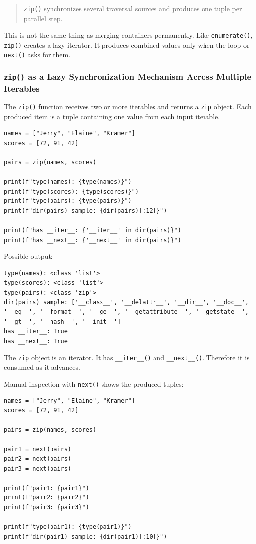 \documentclass[a4paper,twoside]{report}
\begin{document}
\begin{quote}
\texttt{zip()} synchronizes several traversal sources and produces one tuple per parallel step.
\end{quote}

This is not the same thing as merging containers permanently. Like \texttt{enumerate()}, \texttt{zip()} creates a lazy iterator. It produces combined values only when the loop or \texttt{next()} asks for them.

\subsubsection{\texttt{zip()} as a Lazy Synchronization Mechanism Across Multiple Iterables}

The \texttt{zip()} function receives two or more iterables and returns a \texttt{zip} object. Each produced item is a tuple containing one value from each input iterable.

\begin{verbatim}
names = ["Jerry", "Elaine", "Kramer"]
scores = [72, 91, 42]

pairs = zip(names, scores)

print(f"type(names): {type(names)}")
print(f"type(scores): {type(scores)}")
print(f"type(pairs): {type(pairs)}")
print(f"dir(pairs) sample: {dir(pairs)[:12]}")

print(f"has __iter__: {'__iter__' in dir(pairs)}")
print(f"has __next__: {'__next__' in dir(pairs)}")
\end{verbatim}

Possible output:

\begin{verbatim}
type(names): <class 'list'>
type(scores): <class 'list'>
type(pairs): <class 'zip'>
dir(pairs) sample: ['__class__', '__delattr__', '__dir__', '__doc__',
'__eq__', '__format__', '__ge__', '__getattribute__', '__getstate__',
'__gt__', '__hash__', '__init__']
has __iter__: True
has __next__: True
\end{verbatim}

The \texttt{zip} object is an iterator. It has \texttt{\_\_iter\_\_()} and \texttt{\_\_next\_\_()}. Therefore it is consumed as it advances.

Manual inspection with \texttt{next()} shows the produced tuples:

\begin{verbatim}
names = ["Jerry", "Elaine", "Kramer"]
scores = [72, 91, 42]

pairs = zip(names, scores)

pair1 = next(pairs)
pair2 = next(pairs)
pair3 = next(pairs)

print(f"pair1: {pair1}")
print(f"pair2: {pair2}")
print(f"pair3: {pair3}")

print(f"type(pair1): {type(pair1)}")
print(f"dir(pair1) sample: {dir(pair1)[:10]}")
\end{verbatim}
\end{document}

